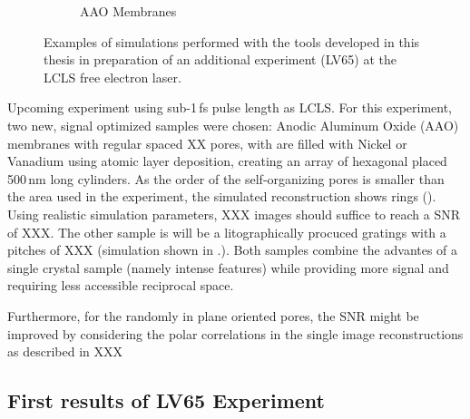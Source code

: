 \begin{figure}
\begin{subfigure}[b]{0.37\textwidth}
	\caption{AAO Membranes}
	\label{fig:outlook_aao}
\end{subfigure}
\caption[Simulations in Preparation of LV65 Experiment]{Examples of simulations performed with the tools developed in this thesis in preparation of an additional experiment (LV65) at the LCLS free electron laser.}
\end{figure}

Upcoming experiment using sub-1\,fs pulse length as LCLS. 
For this experiment, two new, signal optimized samples were chosen: Anodic Aluminum Oxide (AAO) membranes with regular spaced XX pores, with are filled with Nickel or Vanadium using atomic layer deposition, creating an array of hexagonal placed  500\,nm long cylinders. As the order of the self-organizing pores is smaller than the area used in the experiment, the simulated reconstruction shows rings (). Using realistic simulation parameters, XXX images should suffice to reach a SNR of XXX.
The other sample is will be a litographically procuced gratings with a pitches of XXX (simulation shown in .). Both samples combine the advantes of a single crystal sample (namely intense features) while providing more signal and requiring less accessible reciprocal space. 


Furthermore, for the randomly in plane oriented pores, the SNR might be improved by considering the polar correlations in the single image reconstructions as described in XXX

\subsection{First results of LV65 Experiment}